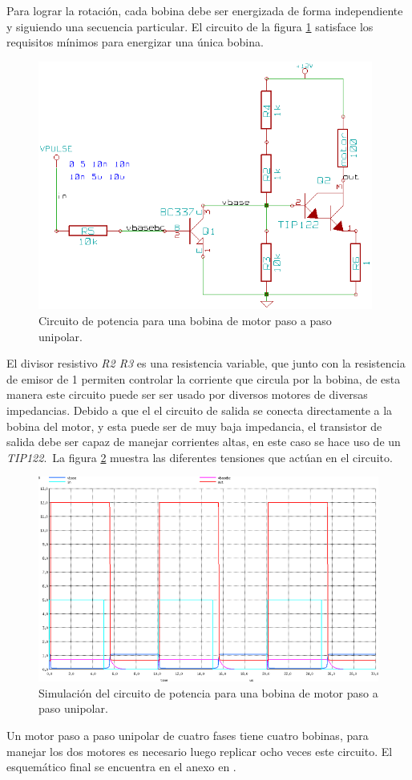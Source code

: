 Para lograr la rotaci\'on, cada bobina debe ser energizada de forma
independiente y siguiendo una secuencia particular. El circuito de la figura
\ref{fig:cir_single_coil} satisface los requisitos m\'inimos para energizar una
\'unica bobina.

\begin{figure}[htp]
\centering
\includegraphics[width=11cm]{./img/cir_single_coil.png}
\caption{Circuito de potencia para una bobina de motor paso a paso unipolar.}
\label{fig:cir_single_coil}
\end{figure}

El divisor resistivo \emph{R2 R3} es una resistencia variable, que junto con
la resistencia de emisor de 1 \ohm  permiten controlar la corriente que circula
por la bobina, de esta manera este circuito puede ser ser usado por diversos
motores de diversas impedancias. Debido a que el el circuito de salida se
conecta directamente a la bobina del motor, y esta puede ser de muy baja
impedancia, el transistor de salida debe ser capaz de manejar corrientes altas,
en este caso se hace uso de un \emph{TIP122}.\
La figura \ref{fig:cir_single_coil_plot} muestra las diferentes tensiones que
act\'uan en el circuito. 

\begin{figure}[htp]
\centering
\includegraphics[width=15cm]{./img/cir_single_coil_plot.png}
\caption{Simulaci\'on del circuito de potencia para una bobina de motor paso a
paso unipolar.}
\label{fig:cir_single_coil_plot}
\end{figure}

Un motor paso a paso unipolar de cuatro fases tiene cuatro bobinas, para
manejar los dos motores es necesario luego replicar ocho veces este circuito.
El esquem\'atico final se encuentra en el anexo en
.\\

